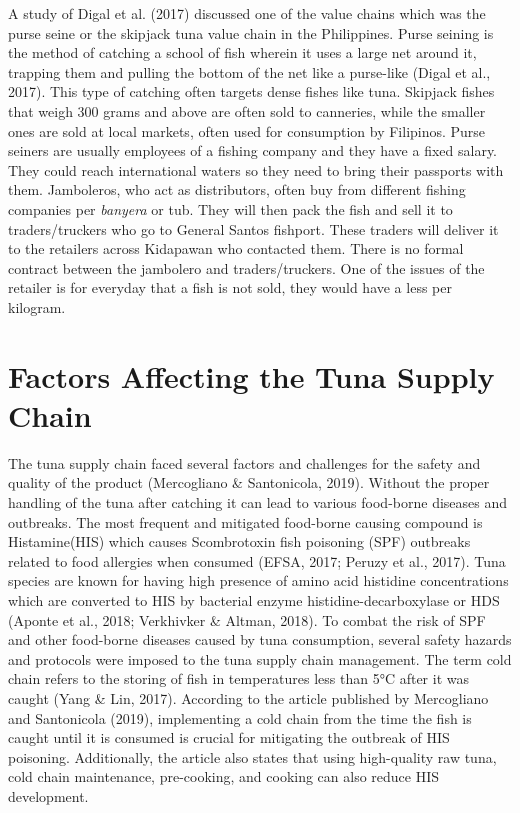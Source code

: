 A study of Digal et al. (2017) discussed one of the value chains which was the purse seine or the skipjack tuna value chain in the Philippines. Purse seining is the method of catching a school of fish wherein it uses a large net around it, trapping them and pulling the bottom of the net like a purse-like (Digal et al., 2017). This type of catching often targets dense fishes like tuna. Skipjack fishes that weigh 300 grams and above are often sold  to canneries, while the smaller ones are sold at local markets, often used for consumption by Filipinos. Purse seiners are usually employees of a fishing company and they have a fixed salary. They could reach international waters so they need to bring their passports with them. Jamboleros, who act as distributors, often buy from different fishing companies per \textit{banyera} or tub. They will then pack the fish and sell it to traders/truckers who go to General Santos fishport. These traders will deliver it to the retailers across Kidapawan who contacted them. There is no formal contract between the jambolero and traders/truckers. One of the issues of the retailer is for everyday that a fish is not sold, they would have a  less per kilogram.

\section{Factors Affecting the Tuna Supply Chain}

The tuna supply chain faced several factors and challenges for the safety and quality of the product (Mercogliano \& Santonicola, 2019). Without the proper handling of the tuna after catching it can lead to various food-borne diseases and outbreaks. The most frequent and mitigated food-borne causing compound is Histamine(HIS) which causes Scombrotoxin fish poisoning (SPF) outbreaks related to food allergies when consumed (EFSA, 2017; Peruzy et al., 2017). Tuna species are known for having high presence of amino acid histidine concentrations which are converted to HIS by bacterial enzyme histidine-decarboxylase or HDS (Aponte et al., 2018; Verkhivker \& Altman, 2018). To combat the risk of SPF and other food-borne diseases caused by tuna consumption, several safety hazards and protocols were imposed to the tuna supply chain management. The term cold chain refers to the storing of fish in temperatures less than 5°C after it was caught (Yang \& Lin, 2017). According to the article published by Mercogliano and Santonicola (2019), implementing a cold chain from the time the fish is caught until it is consumed is crucial for mitigating the outbreak of HIS poisoning. Additionally, the article also states that using high-quality raw tuna, cold chain maintenance, pre-cooking, and cooking can also reduce HIS development. 

